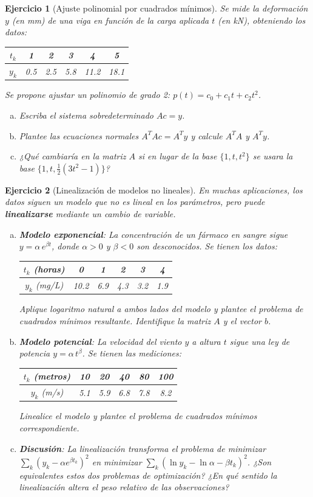 \documentclass[12pt]{article}
\newtheorem{exercise}{Ejercicio}
\begin{document}
\begin{exercise}[Ajuste polinomial por cuadrados mínimos]
Se mide la deformación $y$ (en mm) de una viga en función de la carga aplicada $t$ (en kN), obteniendo los datos:
\begin{center}
\begin{tabular}{c|ccccc}
$t_k$ & 1 & 2 & 3 & 4 & 5 \\ \hline
$y_k$ & 0.5 & 2.5 & 5.8 & 11.2 & 18.1
\end{tabular}
\end{center}
Se propone ajustar un polinomio de grado 2: $p(t) = c_0 + c_1 t + c_2 t^2$.
\begin{enumerate}[(a)]
\item Escriba el sistema sobredeterminado $Ac = y$.
\item Plantee las ecuaciones normales $A^TAc = A^Ty$ y calcule $A^TA$ y $A^Ty$.
\item ¿Qué cambiaría en la matriz $A$ si en lugar de la base $\{1, t, t^2\}$ se usara la base $\{1, t, \tfrac{1}{2}(3t^2-1)\}$?
\end{enumerate}
\end{exercise}

\begin{exercise}[Linealización de modelos no lineales]
En muchas aplicaciones, los datos siguen un modelo que no es lineal en los parámetros, pero puede \textbf{linealizarse} mediante un cambio de variable.
\begin{enumerate}[(a)]
\item \textbf{Modelo exponencial}: La concentración de un fármaco en sangre sigue $y = \alpha \, e^{\beta t}$, donde $\alpha > 0$ y $\beta < 0$ son desconocidos. Se tienen los datos:
\begin{center}
\begin{tabular}{c|ccccc}
$t_k$ (horas) & 0 & 1 & 2 & 3 & 4 \\ \hline
$y_k$ (mg/L) & 10.2 & 6.9 & 4.3 & 3.2 & 1.9
\end{tabular}
\end{center}
Aplique logaritmo natural a ambos lados del modelo y plantee el problema de cuadrados mínimos resultante. Identifique la matriz $A$ y el vector $b$.
\item \textbf{Modelo potencial}: La velocidad del viento $y$ a altura $t$ sigue una ley de potencia $y = \alpha \, t^{\beta}$. Se tienen las mediciones:
\begin{center}
\begin{tabular}{c|ccccc}
$t_k$ (metros) & 10 & 20 & 40 & 80 & 100 \\ \hline
$y_k$ (m/s) & 5.1 & 5.9 & 6.8 & 7.8 & 8.2
\end{tabular}
\end{center}
Linealice el modelo y plantee el problema de cuadrados mínimos correspondiente.
\item \textbf{Discusión}: La linealización transforma el problema de minimizar $\sum_k (y_k - \alpha e^{\beta t_k})^2$ en minimizar $\sum_k (\ln y_k - \ln\alpha - \beta t_k)^2$. ¿Son equivalentes estos dos problemas de optimización? ¿En qué sentido la linealización altera el peso relativo de las observaciones?
\end{enumerate}
\end{exercise}
\end{document}
